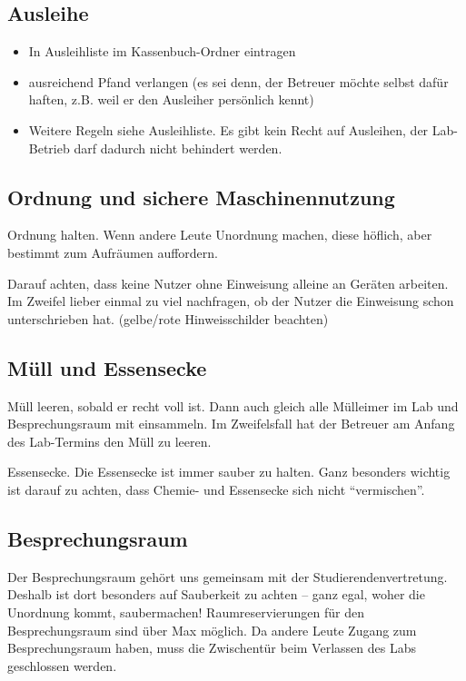 \documentclass{\basedir/fablab-document}
\begin{document}
\subsection{Ausleihe}
\begin{itemize}
 \item In Ausleihliste im Kassenbuch-Ordner eintragen
 \item ausreichend Pfand verlangen (es sei denn, der Betreuer möchte selbst dafür haften, z.B. weil er den Ausleiher persönlich kennt)
 \item Weitere Regeln siehe Ausleihliste. Es gibt kein Recht auf Ausleihen, der Lab-Betrieb darf dadurch nicht behindert werden.
\end{itemize}

\subsection{Ordnung und sichere Maschinennutzung}
Ordnung halten. Wenn andere Leute Unordnung machen, diese höflich, aber bestimmt zum Aufräumen auffordern.

Darauf achten, dass keine Nutzer ohne Einweisung alleine an Geräten arbeiten. Im Zweifel lieber einmal zu viel nachfragen, ob der Nutzer die Einweisung schon unterschrieben hat. (gelbe/rote Hinweisschilder beachten)

\subsection{Müll und Essensecke}
Müll leeren, sobald er recht voll ist. Dann auch gleich alle Mülleimer im Lab und Besprechungsraum mit einsammeln. Im Zweifelsfall hat der Betreuer am Anfang des Lab-Termins den Müll zu leeren.

Essensecke. Die Essensecke ist immer sauber zu halten. Ganz besonders wichtig ist darauf zu achten, dass Chemie- und Essensecke sich nicht \enquote{vermischen}.

\subsection{Besprechungsraum}
Der Besprechungsraum gehört uns gemeinsam mit der Studierendenvertretung. Deshalb ist dort besonders auf Sauberkeit zu achten -- ganz egal, woher die Unordnung kommt, saubermachen!
Raumreservierungen für den Besprechungsraum sind über Max möglich. Da andere Leute Zugang zum Besprechungsraum haben, muss die Zwischentür beim Verlassen des Labs geschlossen werden.
\end{document}
